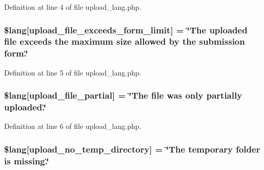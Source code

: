 Definition at line 4 of file upload\+\_\+lang.\+php.

\subsubsection[{\texorpdfstring{\$lang}{$lang}}]{\setlength{\rightskip}{0pt plus 5cm}\$lang\mbox{[}\textquotesingle{}upload\+\_\+file\+\_\+exceeds\+\_\+form\+\_\+limit\textquotesingle{}\mbox{]} = \char`\"{}The uploaded file exceeds the maximum size allowed by the submission form.\char`\"{}}\hypertarget{system_2language_2english_2upload__lang_8php_af6f65d563af150d50dfc6957079fd529}{}\label{system_2language_2english_2upload__lang_8php_af6f65d563af150d50dfc6957079fd529}


Definition at line 5 of file upload\+\_\+lang.\+php.

\subsubsection[{\texorpdfstring{\$lang}{$lang}}]{\setlength{\rightskip}{0pt plus 5cm}\$lang\mbox{[}\textquotesingle{}upload\+\_\+file\+\_\+partial\textquotesingle{}\mbox{]} = \char`\"{}The file was only partially uploaded.\char`\"{}}\hypertarget{system_2language_2english_2upload__lang_8php_a79751b02ce35007a90bd9052f83deed9}{}\label{system_2language_2english_2upload__lang_8php_a79751b02ce35007a90bd9052f83deed9}


Definition at line 6 of file upload\+\_\+lang.\+php.

\subsubsection[{\texorpdfstring{\$lang}{$lang}}]{\setlength{\rightskip}{0pt plus 5cm}\$lang\mbox{[}\textquotesingle{}upload\+\_\+no\+\_\+temp\+\_\+directory\textquotesingle{}\mbox{]} = \char`\"{}The temporary folder is missing.\char`\"{}}\hypertarget{system_2language_2english_2upload__lang_8php_ac7144f4992346816875bac28488ef715}{}\label{system_2language_2english_2upload__lang_8php_ac7144f4992346816875bac28488ef715}


